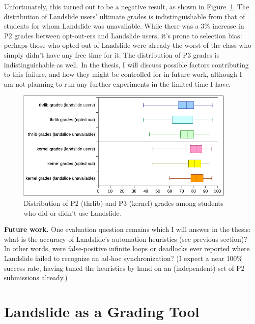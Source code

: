 Unfortunately, this turned out to be a negative result, as shown in Figure~\ref{fig:grade-distribution}.
The distribution of Landslide users' ultimate grades is indistinguishable from that of students for whom Landslide was unavailable.
While there was a 3\% increase in P2 grades between opt-out-ers and Landslide users, it's prone to selection bias:
perhaps those who opted out of Landslide were already the worst of the class who simply didn't have any free time for it.
The distribution of P3 grades is indistinguishable as well.
In the thesis, I will discuss possible factors contributing to this failure, and how they might be controlled for in future work,
although I am not planning to run any further experiments in the limited time I have.

\begin{figure}[h]
	\begin{center}
	\includegraphics[width=0.96\textwidth]{p2-p3-distribution.pdf}
	\end{center}
	\caption{Distribution of P2 (thrlib) and P3 (kernel) grades among students who did or didn't use Landslide.}
	\label{fig:grade-distribution}
\end{figure}


{\bf Future work.}
One evaluation question remains which I will answer in the thesis:
what is the accuracy of Landslide's automation heuristics (see previous section)?
In other words, were false-positive infinite loops or deadlocks ever reported
where Landslide failed to recognize an ad-hoc synchronization?
(I expect a near 100\% success rate,
having tuned the heuristics by hand on an (independent) set of P2 submissions already.)

\section{Landslide as a Grading Tool}
\label{sec:grading}

